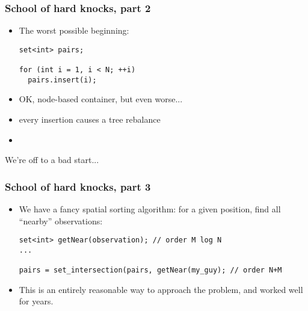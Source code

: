 \begin{frame}[fragile]
\frametitle{School of hard knocks, part 2}

\begin{itemize}[<+->]
\item The worst possible beginning:
{\scriptsize\begin{verbatim}
set<int> pairs;

for (int i = 1, i < N; ++i)
  pairs.insert(i);
\end{verbatim}
}
\item OK, node-based container, but even worse...
\item every insertion causes a tree rebalance
\item {}
\end{itemize}

\begin{centering}
We're off to a bad start...
\end{centering}

\end{frame}


\begin{frame}[fragile]
\frametitle{School of hard knocks, part 3}

\begin{itemize}[<+->]
\item We have a fancy spatial sorting algorithm: for a given position,
  find all ``nearby'' observations:
{\scriptsize\begin{verbatim}
set<int> getNear(observation); // order M log N
...

pairs = set_intersection(pairs, getNear(my_guy); // order N+M
\end{verbatim}
}
\item This is an entirely reasonable way to approach the problem, and
  worked well for years.
\end{itemize}

\end{frame}


